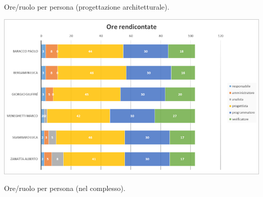 \documentclass[a4paper]{letter} %
\begin{document}
\begin{center}
	Ore/ruolo per persona (progettazione architetturale).
\end{center}

\vspace{3cm}

\includegraphics[scale=0.5]{orerend1.png}

\begin{center}
	Ore/ruolo per persona (nel complesso).
\end{center}
\end{document}
